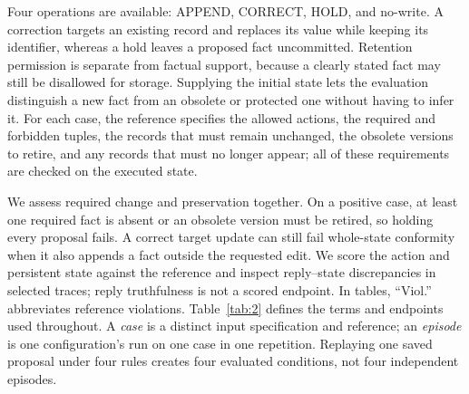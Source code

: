 \documentclass[acmsmall,review]{acmart}
\begin{document}
Four operations are available: APPEND, CORRECT, HOLD, and no-write. A correction targets an existing record and replaces its value while keeping its identifier, whereas a hold leaves a proposed fact uncommitted. Retention permission is separate from factual support, because a clearly stated fact may still be disallowed for storage. Supplying the initial state lets the evaluation distinguish a new fact from an obsolete or protected one without having to infer it. For each case, the reference specifies the allowed actions, the required and forbidden tuples, the records that must remain unchanged, the obsolete versions to retire, and any records that must no longer appear; all of these requirements are checked on the executed state.

We assess required change and preservation together. On a positive case, at least one required fact is absent or an obsolete version must be retired, so holding every proposal fails. A correct target update can still fail whole-state conformity when it also appends a fact outside the requested edit. We score the action and persistent state against the reference and inspect reply--state discrepancies in selected traces; reply truthfulness is not a scored endpoint. In tables, ``Viol.'' abbreviates reference violations. Table~\ref{tab:2} defines the terms and endpoints used throughout. A \emph{case} is a distinct input specification and reference; an \emph{episode} is one configuration's run on one case in one repetition. Replaying one saved proposal under four rules creates four evaluated conditions, not four independent episodes.
\end{document}
